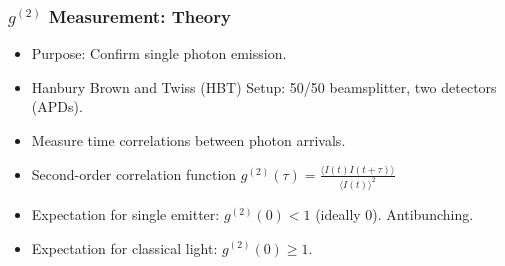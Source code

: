 \documentclass{beamer}
\begin{document}
\begin{frame}
\frametitle{$g^{(2)}$ Measurement: Theory}
\begin{itemize}
    \item Purpose: Confirm single photon emission.
    \item Hanbury Brown and Twiss (HBT) Setup: 50/50 beamsplitter, two detectors (APDs).
    \item Measure time correlations between photon arrivals.
    \item Second-order correlation function $g^{(2)}(\tau) = \frac{\langle I(t)I(t+\tau) \rangle}{\langle I(t) \rangle^2}$
    \item Expectation for single emitter: $g^{(2)}(0) < 1$ (ideally 0). Antibunching.
    \item Expectation for classical light: $g^{(2)}(0) \ge 1$.
\end{itemize}
\end{frame}
\end{document}
